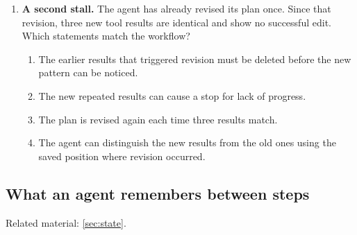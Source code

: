 \begin{enumerate}[start=1,itemsep=0.7\baselineskip]
\item\label{exercise:10} \begin{minipage}[t]{\linewidth}
\textbf{A second stall.} The agent has already revised its plan once. Since that revision, three new tool results are identical and show no successful edit. Which statements match the workflow?
\begin{enumerate}[label=\textnormal{(\Alph*)},leftmargin=*,itemsep=0pt]
\item The earlier results that triggered revision must be deleted before the new pattern can be noticed.
\item The new repeated results can cause a stop for lack of progress.
\item The plan is revised again each time three results match.
\item The agent can distinguish the new results from the old ones using the saved position where revision occurred.
\end{enumerate}
\end{minipage}

\end{enumerate}

\subsection{What an agent remembers between steps}
\noindent Related material: \cref{sec:state}.

